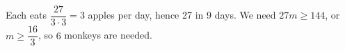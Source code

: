Each eats $\dfrac{27}{3\cdot3}=3$ apples per day, hence 27 in 9 days. We need $27m\ge144$, or $m\ge\dfrac{16}{3}$, so $\boxed6$ monkeys are needed.
